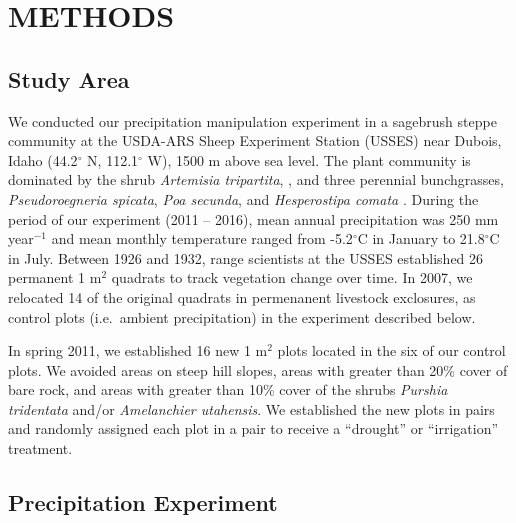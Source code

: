 \documentclass[fleqn,10pt,lineno]{wlpeerj} %
\begin{document}
\hypertarget{methods}{%
\section{METHODS}\label{methods}}

\hypertarget{study-area}{%
\subsection{Study Area}\label{study-area}}

We conducted our precipitation manipulation experiment in a sagebrush
steppe community at the USDA-ARS Sheep Experiment Station (USSES) near
Dubois, Idaho (44.2\(^{\circ}\) N, 112.1\(^{\circ}\) W), 1500 m above
sea level. The plant community is dominated by the shrub
\emph{Artemisia tripartita},
, and three
perennial bunchgrasses, \emph{Pseudoroegneria spicata},
\emph{Poa secunda}, and \emph{Hesperostipa comata}
. During the period of
our experiment (2011 -- 2016), mean annual precipitation was 250 mm
year\(\phantom{}^{-1}\) and mean monthly temperature ranged from
-5.2\(^{\circ}\)C in January to 21.8\(^{\circ}\)C in July. Between 1926
and 1932, range scientists at the USSES established 26 permanent 1
m\(^2\) quadrats to track vegetation change over time. In 2007, we
relocated 14 of the original quadrats in permenanent livestock
exclosures,  as control plots (i.e.~ambient
precipitation) in the experiment described below.

In spring 2011, we established 16 new 1 m\(^2\) plots located in the
 six of our
control plots. We avoided areas on steep hill slopes, areas with greater
than 20\% cover of bare rock, and areas with greater than 10\% cover of
the shrubs \emph{Purshia tridentata} and/or
\emph{Amelanchier utahensis}. We established the new plots in pairs and
randomly assigned each plot in a pair to receive a ``drought'' or
``irrigation'' treatment.

\hypertarget{precipitation-experiment}{%
\subsection{Precipitation Experiment}\label{precipitation-experiment}}
\end{document}
